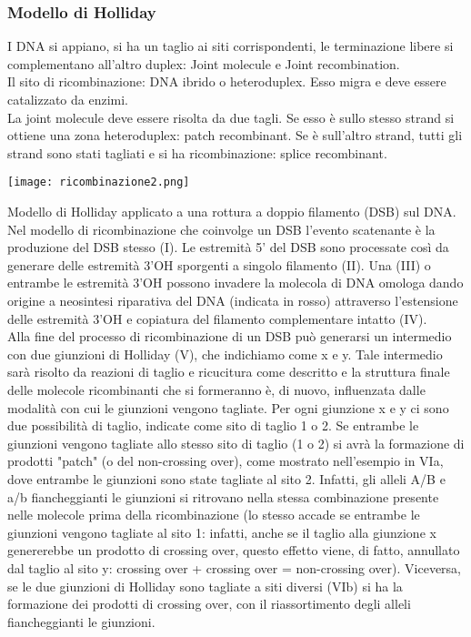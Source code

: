\documentclass{article}
\begin{document}
\subsubsection{Modello di Holliday}
I DNA si appiano, si ha un taglio ai siti corrispondenti, le terminazione libere si complementano all'altro duplex: Joint molecule e Joint recombination.\\
Il sito di ricombinazione: DNA ibrido o heteroduplex. Esso migra e deve essere catalizzato da enzimi.\\
La joint molecule deve essere risolta da due tagli. Se esso è sullo stesso strand si ottiene una zona heteroduplex: patch recombinant. Se è sull'altro strand, tutti gli strand sono stati tagliati e si ha ricombinazione: splice recombinant.
\begin{center}
    \texttt{[image: ricombinazione2.png]}
\end{center}
Modello di Holliday applicato a una rottura a doppio filamento (DSB) sul DNA. Nel modello di ricombinazione che
coinvolge un DSB l'evento scatenante è la produzione del DSB stesso (I). Le estremità 5' del DSB sono processate così
da generare delle estremità 3'OH sporgenti a singolo filamento (II). Una (III) o entrambe le estremità 3'OH possono
invadere la molecola di DNA omologa dando origine a neosintesi riparativa del DNA (indicata in rosso) attraverso
l'estensione delle estremità 3'OH e copiatura del filamento complementare intatto (IV).\\
Alla fine del processo di ricombinazione di un DSB può generarsi un intermedio con due giunzioni di Holliday (V), che
indichiamo come x e y. Tale intermedio sarà risolto da reazioni di taglio e ricucitura come descritto e la struttura finale delle
molecole ricombinanti che si formeranno è, di nuovo, influenzata dalle modalità con cui le giunzioni vengono tagliate. Per ogni
giunzione x e y ci sono due possibilità di taglio, indicate come sito di taglio 1 o 2. Se entrambe le giunzioni vengono tagliate allo
stesso sito di taglio (1 o 2) si avrà la formazione di prodotti "patch" (o del non-crossing over), come mostrato nell'esempio in
VIa, dove entrambe le giunzioni sono state tagliate al sito 2. Infatti, gli alleli A/B e a/b fiancheggianti le giunzioni si ritrovano
nella stessa combinazione presente nelle molecole prima della ricombinazione (lo stesso accade se entrambe le giunzioni
vengono tagliate al sito 1: infatti, anche se il taglio alla giunzione x genererebbe un prodotto di crossing over, questo effetto
viene, di fatto, annullato dal taglio al sito y: crossing over + crossing over = non-crossing over). Viceversa, se le due giunzioni di
Holliday sono tagliate a siti diversi (VIb) si ha la formazione dei prodotti di crossing over, con il riassortimento degli alleli
fiancheggianti le giunzioni.
\end{document}
